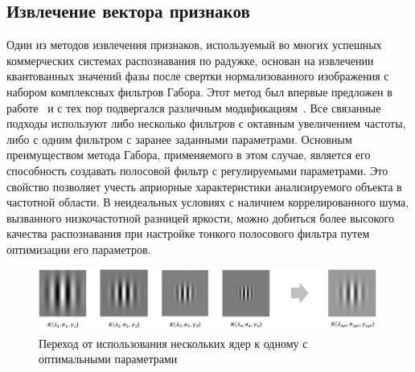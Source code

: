 \subsection{Извлечение вектора признаков}
\label{sec:fe-gabor}

Один из методов извлечения признаков, используемый во многих успешных коммерческих системах распознавания по радужке, основан на извлечении квантованных значений фазы после свертки нормализованного изображения с набором комплексных фильтров Габора. Этот метод был впервые предложен в работе~\cite{daugman_1993} и с тех пор подвергался различным модификациям~\cite {si_2012, thornton_2007}. Все связанные подходы используют либо несколько фильтров с октавным увеличением частоты, либо с одним фильтром с заранее заданными параметрами. Основным преимуществом метода Габора, применяемого в этом случае, является его способность создавать полосовой фильтр с регулируемыми параметрами. Это свойство позволяет учесть априорные характеристики анализируемого объекта в частотной области. В неидеальных условиях с наличием коррелированного шума, вызванного низкочастотной разницей яркости, можно добиться более высокого качества распознавания при настройке тонкого полосового фильтра путем оптимизации его параметров.

\medspace
\begin{figure}[h]
	\begin{center}
		\includegraphics[width=0.95\columnwidth]{pictures/gabor-kernels.png}
		\caption{Переход от использования нескольких ядер к одному с оптимальными параметрами}
		\label{fig:gabor-kernels}
	\end{center}
\end{figure}

